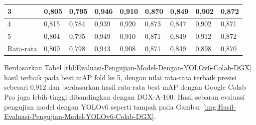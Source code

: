 \begin{singlespace}
\begin{table}[H]
\begin{tabular}{|p{1cm}|p{1cm}p{1cm}|p{1cm}p{1cm}|p{1cm}p{1cm}|p{1cm}p{1cm}|}
			3                                              & \multicolumn{1}{p{1cm}|}{0,805}                                    & 0,795     & \multicolumn{1}{p{1cm}|}{0,946}                                    & 0,910     & \multicolumn{1}{p{1cm}|}{0,870}                                    & 0,849     & \multicolumn{1}{p{1cm}|}{0,902}                                     & 0,872     \\ \hline
			
			4                                              & \multicolumn{1}{p{1cm}|}{0,815}                                    & 0,784     & \multicolumn{1}{p{1cm}|}{0,939}                                    & 0,920     & \multicolumn{1}{p{1cm}|}{0,873}                                    & 0,847     & \multicolumn{1}{p{1cm}|}{0,902}                                     & 0,871     \\ \hline
			
			5                                              & \multicolumn{1}{p{1cm}|}{0,804}                                    & 0,795     & \multicolumn{1}{p{1cm}|}{0,949}                                    & 0,910     & \multicolumn{1}{p{1cm}|}{0,871}                                    & 0,849     & \multicolumn{1}{p{1cm}|}{0,912}                                     & 0,872     \\ \hline
			
			Rata-rata                                      & \multicolumn{1}{p{1cm}|}{0,809}                                    & 0,798     & \multicolumn{1}{p{1cm}|}{0,943}                                    & 0,908     & \multicolumn{1}{p{1cm}|}{0,871}                                    & 0,849     & \multicolumn{1}{p{1cm}|}{0,898}                                     & 0,870     \\ \hline
			
		\end{tabular}
	\end{table}
\end{singlespace}

Berdasarkan Tabel \ref{tbl:Evaluasi-Pengujian-Model-Dengan-YOLOv6-Colab-DGX} hasil terbaik pada best mAP fold ke 5, dengan nilai rata-rata terbaik presisi sebesari 0,912 dan berdasarkan hasil rata-rata best mAP dengan Google Colab Pro juga lebih tinggi dibandingkan dengan DGX-A-100. Hasil sebaran evaluasi pengujian model dengan YOLOv6 seperti tampak pada Gambar \ref{img:Hasil-Evaluasi-Pengujian-Model-YOLOv6-Colab-DGX}. 

